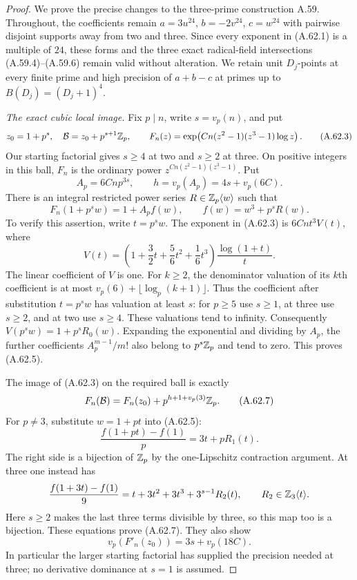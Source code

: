 \begin{proof}
We prove the precise changes to the three-prime
construction A.59. Throughout, the coefficients
remain
$a=3u^{24}$, $b=-2v^{24}$, $c=w^{24}$
with pairwise disjoint supports away from two
and three. Since every exponent in (A.62.1)
is a multiple of $24$, these forms and the
three exact radical-field intersections
(A.59.4)--(A.59.6) remain valid without alteration.
We retain unit $D_j$-points at every finite
prime and high precision of $a+b-c$ at primes
up to $B(D_j)=(D_j+1)^4$.

\emph{The exact cubic local image.}
Fix $p\mid n$, write $s=v_p(n)$, and put
\[
 z_0=1+p^s,\quad
 \mathcal B=z_0+p^{s+1}\mathbb Z_p,\qquad
 F_n(z)=
 \exp\!\left(Cn(z^2-1)(z^3-1)\log z\right).
 \tag{A.62.3}
\]
Our starting factorial gives $s\ge4$ at two
and $s\ge2$ at three.
On positive integers in this ball, $F_n$ is
the ordinary power $z^{Cn(z^2-1)(z^3-1)}$.
Put
\[
 A_p=6Cn p^{3s},\qquad h=v_p(A_p)=4s+v_p(6C).
 \tag{A.62.4}
\]
There is an integral restricted power series
$R\in\mathbb Z_p\langle w\rangle$ such that
\[
 F_n(1+p^s w)=1+A_p f(w),
                       \qquad f(w)=w^3+p^sR(w).
 \tag{A.62.5}
\]
To verify this assertion, write $t=p^s w$.
The exponent in (A.62.3) is
$6Cn t^3V(t)$, where
\[
 V(t)=\left(1+\frac32t+\frac56t^2+\frac16t^3\right)
                         \frac{\log(1+t)}t.
 \tag{A.62.6}
\]
The linear coefficient of $V$ is one.
For $k\ge2$, the denominator valuation of
its $k$th coefficient is at most
$v_p(6)+\lfloor\log_p(k+1)\rfloor$.
Thus the coefficient after substitution
$t=p^s w$ has valuation at least $s$:
for $p\ge5$ use $s\ge1$, at three use
$s\ge2$, and at two use $s\ge4$.
These valuations tend to infinity.
Consequently $V(p^s w)=1+p^sR_0(w)$.
Expanding the exponential and dividing
by $A_p$, the further coefficients
$A_p^{m-1}/m!$ also belong to $p^s\mathbb Z_p$
and tend to zero. This proves (A.62.5).

The image of (A.62.3) on the required ball is exactly
\[
       F_n(\mathcal B)
           =F_n(z_0)+p^{h+1+v_p(3)}\mathbb Z_p.
 \tag{A.62.7}
\]
For $p\ne3$, substitute $w=1+pt$ into (A.62.5):
\[
       \frac{f(1+pt)-f(1)}p=3t+pR_1(t).
\]
The right side is a bijection of $\mathbb Z_p$
by the one-Lipschitz contraction argument.
At three one instead has
\[
       \frac{f(1+3t)-f(1)}9
              =t+3t^2+3t^3+3^{s-1}R_2(t),
                      \qquad R_2\in\mathbb Z_3\langle t\rangle.
\]
Here $s\ge2$ makes the last three terms
divisible by three, so this map too is a
bijection. These equations prove (A.62.7).
They also show
\[
                    v_p(F'_n(z_0))
                        =3s+v_p(18C).
 \tag{A.62.8}
\]
In particular the larger starting factorial
has supplied the precision needed at three;
no derivative dominance at $s=1$ is assumed.


\end{proof}
